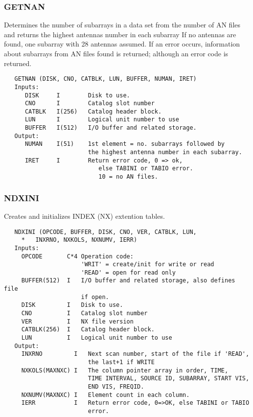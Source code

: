 \subsubsection{GETNAN}
Determines the number of subarrays in a data set from the number
of AN files and returns the highest antennas number in each subarray
If no antennas are found, one subarray with 28 antennas assumed.
If an error occurs, information about subarrays from AN files found
is returned; although an error code is returned.
\begin{verbatim}
   GETNAN (DISK, CNO, CATBLK, LUN, BUFFER, NUMAN, IRET)
   Inputs:
      DISK     I        Disk to use.
      CNO      I        Catalog slot number
      CATBLK   I(256)   Catalog header block.
      LUN      I        Logical unit number to use
      BUFFER   I(512)   I/O buffer and related storage.
   Output:
      NUMAN    I(51)    1st element = no. subarrays followed by
                        the highest antenna number in each subarray.
      IRET     I        Return error code, 0 => ok,
                           else TABINI or TABIO error.
                           10 = no AN files.
\end{verbatim}

\subsubsection{NDXINI}
Creates and initializes INDEX (NX) extention tables.
\begin{verbatim}
   NDXINI (OPCODE, BUFFER, DISK, CNO, VER, CATBLK, LUN,
     *   INXRNO, NXKOLS, NXNUMV, IERR)
   Inputs:
     OPCODE       C*4 Operation code:
                      'WRIT' = create/init for write or read
                      'READ' = open for read only
     BUFFER(512)  I   I/O buffer and related storage, also defines file
                      if open.
     DISK         I   Disk to use.
     CNO          I   Catalog slot number
     VER          I   NX file version
     CATBLK(256)  I   Catalog header block.
     LUN          I   Logical unit number to use
   Output:
     INXRNO         I   Next scan number, start of the file if 'READ',
                        the last+1 if WRITE
     NXKOLS(MAXNXC) I   The column pointer array in order, TIME,
                        TIME INTERVAL, SOURCE ID, SUBARRAY, START VIS,
                        END VIS, FREQID.
     NXNUMV(MAXNXC) I   Element count in each column.
     IERR           I   Return error code, 0=>OK, else TABINI or TABIO
                        error.
\end{verbatim}

